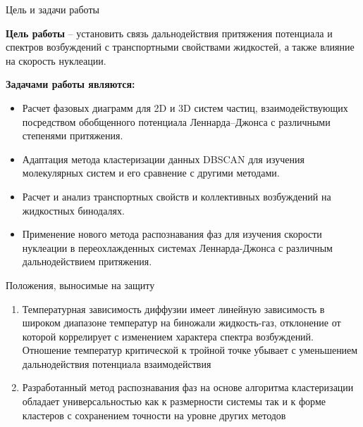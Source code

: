 \documentclass{beamer}
\begin{document}
\begin{frame}{Цель и задачи работы}
\footnotesize{

\textbf{Цель работы} -- установить связь дальнодействия притяжения потенциала и спектров возбуждений с транспортными свойствами жидкостей, а также влияние на скорость нуклеации.

\vspace{0.5cm}

\textbf{Задачами работы являются:}
\begin{itemize}
\item Расчет фазовых диаграмм для 2D и 3D систем частиц, взаимодействующих посредством обобщенного потенциала Леннарда--Джонса с различными степенями притяжения.
\item Адаптация метода кластеризации данных DBSCAN для изучения молекулярных систем и его сравнение с другими методами.
\item Расчет и анализ транспортных свойств и коллективных возбуждений на жидкостных бинодалях.
\item Применение нового метода распознавания фаз для изучения скорости нуклеации в переохлажденных системах Леннарда-Джонса с различным дальнодействием притяжения.
\end{itemize}


}
\end{frame}






\begin{frame}{Положения, выносимые на защиту}
\footnotesize{

\begin{enumerate}
\item Температурная зависимость диффузии имеет линейную зависимость в широком диапазоне температур на биножали жидкость-газ, отклонение от которой коррелирует с изменением характера спектра возбуждений. Отношение температур критической к тройной точке убывает с уменьшением дальнодействия потенциала взаимодействия
\item Разработанный метод распознавания фаз на основе алгоритма кластеризации обладает универсальностью как к размерности системы так и к форме кластеров с сохранением точности на уровне других методов
\end{enumerate}



}
\end{frame}
\end{document}

